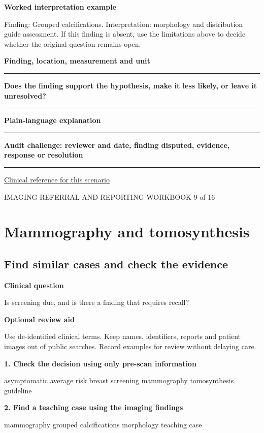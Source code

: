\documentclass[11pt,a4paper]{article}
\newcommand{\record}[1]{\textbf{#1}\par\vspace{0.55\baselineskip}\hrule\vspace{0.35\baselineskip}}
\begin{document}
\textbf{Worked interpretation example}\par Finding: Grouped calcifications. Interpretation: morphology and distribution guide assessment. If this finding is absent, use the limitations above to decide whether the original question remains open.\par

\record{Finding, location, measurement and unit}

\record{Does the finding support the hypothesis, make it less likely, or leave it unresolved?}

\record{Plain-language explanation}

\record{Audit challenge: reviewer and date, finding disputed, evidence, response or resolution}

\small\href{https://www.uspreventiveservicestaskforce.org/uspstf/recommendation/breast-cancer-screening}{Clinical reference for this scenario}

\normalsize

\newpage

{\small IMAGING REFERRAL AND REPORTING WORKBOOK \hfill 9 of 16}

\section*{Mammography and tomosynthesis}

\subsection*{Find similar cases and check the evidence}

\textbf{Clinical question}\par Is screening due, and is there a finding that requires recall?\par

\textbf{Optional review aid}\par Use de-identified clinical terms. Keep names, identifiers, reports and patient images out of public searches. Record examples for review without delaying care.\par

\textbf{1. Check the decision using only pre-scan information}\par asymptomatic average risk breast screening mammography tomosynthesis guideline\par

\textbf{2. Find a teaching case using the imaging findings}\par mammography grouped calcifications morphology teaching case\par
\end{document}
